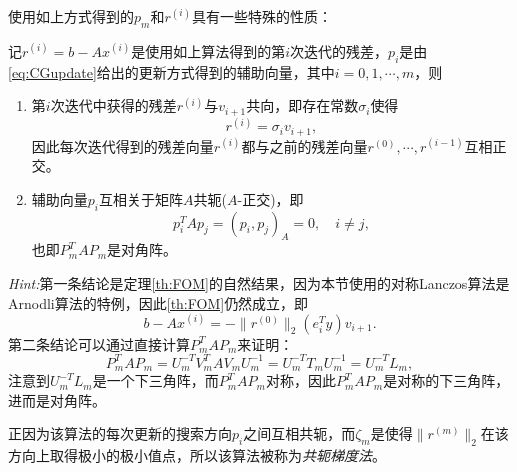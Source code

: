 \documentclass[a4paper,10pt]{ctexart}
\begin{document}
使用如上方式得到的$ p_m $和$ r^{(i)} $具有一些特殊的性质：
\begin{theorem}
    记$ r^{(i)} = b - Ax^{(i)} $是使用如上算法得到的第$ i $次迭代的残差，$ p_i $是由\eqref{eq:CGupdate}给出的更新方式得到的辅助向量，其中$ i=0,1,\cdots ,m $，则
    \begin{enumerate}
        \item 第$ i $次迭代中获得的残差$ r^{(i)} $与$ v_{i+1} $共向，即存在常数$ \sigma_i $使得
        \begin{equation}
            r^{(i)} = \sigma_i v_{i+1},
        \end{equation}
        因此每次迭代得到的残差向量$ r^{(i)} $都与之前的残差向量$ r^{(0)},\cdots ,r^{(i-1)} $互相正交。
        \item 辅助向量$ p_i $互相关于矩阵$ A $共轭($ A $-正交)，即
        \begin{equation}
            p_i^TAp_j = (p_i,p_j)_A = 0,\quad i\neq j,
        \end{equation}
        也即$ P_m^TAP_m $是对角阵。
    \end{enumerate}
\end{theorem}
\noindent \emph{Hint:}第一条结论是定理\ref{th:FOM}的自然结果，因为本节使用的对称Lanczos算法是Arnodli算法的特例，因此\ref{th:FOM}仍然成立，即
\[
    b - Ax^{(i)} = - \| r^{(0)} \|_2 (e_i^T y)v_{i+1}.
\]
第二条结论可以通过直接计算$ P_m^TAP_m $来证明：
\begin{equation}
    P_m^TAP_m = U_m^{-T}V_m^{T}AV_mU_m^{-1} = U_m^{-T}T_mU_m^{-1} = U_m^{-T}L_m,
\end{equation}
注意到$ U_m^{-T}L_m $是一个下三角阵，而$ P_m^TAP_m $对称，因此$ P_m^TAP_m $是对称的下三角阵，进而是对角阵。

正因为该算法的每次更新的搜索方向$ p_i $之间互相共轭，而$ \zeta_m $是使得$ \| r^{(m)} \|_2 $在该方向上取得极小的极小值点，所以该算法被称为\emph{共轭梯度法}。
\end{document}

